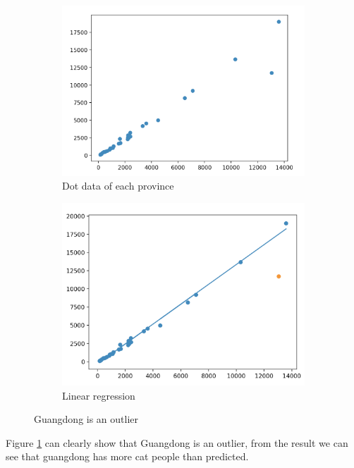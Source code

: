 \documentclass[12pt]{article}
\begin{document}
\begin{figure}[h!]
  \centering
  \begin{subfigure}[b]{0.43\linewidth}
    \includegraphics[width=\linewidth]{../Province/plot.png}
    \caption{Dot data of each province}
  \end{subfigure}
  \begin{subfigure}[b]{0.4\linewidth}
    \includegraphics[width=\linewidth]{../Province/regression.png}
    \caption{Linear regression}
  \end{subfigure}
  \caption{Guangdong is an outlier}
  \label{fig:regression}
\end{figure}

Figure \ref{fig:regression} can clearly show that Guangdong is an outlier, from the result we can see that guangdong has more cat people than predicted.
\end{document}
